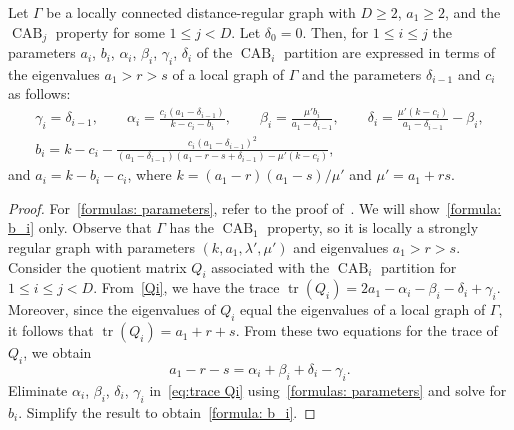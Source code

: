 \begin{lemm}[cf. {\cite[Theorem 2.7]{JK2000-1}}] \label{lem:CAB parameters}
Let $\Gamma$ be a locally connected distance-regular graph with $D\geqslant 2$, $a_1\geqslant 2$, and the $\operatorname{CAB}_j$ property for some $1\leqslant j<D$. Let $\delta_0=0$.
Then, for $1\leqslant i \leqslant j$ the parameters $a_i$, $b_i$, $\alpha_i$, $\beta_i$, $\gamma_i$, $\delta_i$ of the $\operatorname{CAB}_i$ partition are expressed in terms of the eigenvalues $a_1>r>s$ of a local graph of $\Gamma$ and the parameters $\delta_{i-1}$ and $c_i$ as follows:
\begin{gather}
	\gamma_i  = \delta_{i-1}, \qquad
	\alpha_i = \frac{c_i(a_1-\delta_{i-1})}{k-c_i-b_i}, \qquad
	\beta_i = \frac{\mu'b_i}{a_1-\delta_{i-1}}, \qquad
	\delta_i = \frac{\mu'(k-c_i)}{a_1-\delta_{i-1}} - \beta_i, 	\label{formulas: parameters} \\
	b_i  = k - c_i - \frac{c_i(a_1 - \delta_{i-1})^2}{(a_1-\delta_{i-1})(a_1 - r - s + \delta_{i-1}) - \mu'(k-c_i)}, \label{formula: b_i}
\end{gather}
and $a_i = k - b_i - c_i$, where $k=(a_1-r)(a_1-s)/\mu'$ and $\mu'=a_1+rs$.
\end{lemm}
\begin{proof}
For~\eqref{formulas: parameters}, refer to the proof of~\cite[Theorem 2.7]{JK2000-1}.
We will show~\eqref{formula: b_i} only.
Observe that $\Gamma$ has the $\operatorname{CAB}_1$ property, so it is locally a strongly regular graph with parameters $(k,a_1, \lambda', \mu')$ and eigenvalues $a_1 > r > s$.
Consider the quotient matrix $Q_i$ associated with the $\operatorname{CAB}_i$ partition for $1\leqslant i \leqslant j < D$.
From~\eqref{Qi}, we have the trace $\operatorname{tr}(Q_i) = 2a_1 - \alpha_i - \beta_i - \delta_i + \gamma_i$.
Moreover, since the eigenvalues of $Q_i$ equal the eigenvalues of a local graph of $\Gamma$, it follows that $\operatorname{tr}(Q_i) = a_1 + r + s$.
From these two equations for the trace of $Q_i$, we obtain
\begin{equation}\label{eq:trace Qi}
	a_1 - r - s  = \alpha_i+\beta_i+\delta_i - \gamma_i .
\end{equation}
Eliminate $\alpha_i$, $\beta_i$, $\delta_i$, $\gamma_i$ in~\eqref{eq:trace Qi} using~\eqref{formulas: parameters} and solve for $b_i$. 
Simplify the result to obtain~\eqref{formula: b_i}.
\end{proof}


